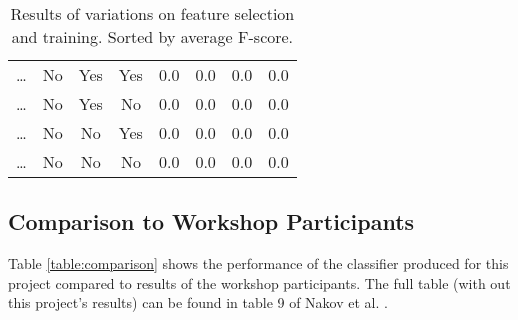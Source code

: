 \documentclass[12pt]{article}
\begin{document}
\begin{table}[H]
\begin{center}
\begin{tabular}{|c|c|c|c|r|r|r|r|}
        \dots       & No        & Yes       & Yes       & 0.0   & 0.0   & 0.0   & 0.0 \\
        \dots       & No        & Yes       & No        & 0.0   & 0.0   & 0.0   & 0.0 \\
        \dots       & No        & No        & Yes       & 0.0   & 0.0   & 0.0   & 0.0 \\
        \dots       & No        & No        & No        & 0.0   & 0.0   & 0.0   & 0.0 \\
        \hline
    \end{tabular}
    \end{center}
    \caption{Results of variations on feature selection and training. Sorted by
        average F-score.}
    \label{table:results}
\end{table}

\subsection{Comparison to Workshop Participants}

Table \ref{table:comparison} shows the performance of the classifier produced
for this project compared to results of the workshop participants. The full
table (with out this project's results) can be found in table 9 of Nakov et al.
\cite{Nakov2013}.
\end{document}
